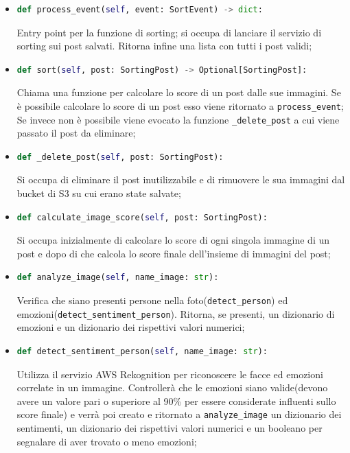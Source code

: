 \begin{itemize}
	\item 
	\begin{lstlisting}[language=Python, numbers=none]
def process_event(self, event: SortEvent) -> dict:
	\end{lstlisting}
Entry point per la funzione di sorting; si occupa di lanciare il servizio di sorting sui post salvati. Ritorna infine una lista con tutti i post validi;
	\item 
	\begin{lstlisting}[language=Python, numbers=none]
def sort(self, post: SortingPost) -> Optional[SortingPost]:
	\end{lstlisting}
Chiama una funzione per calcolare lo score di un post dalle sue immagini. Se è possibile calcolare lo score di un post esso viene ritornato a \verb+process_event+; Se invece non è possibile viene evocato la funzione \verb+_delete_post+ a cui viene passato il post da eliminare;
	\item 
	\begin{lstlisting}[language=Python, numbers=none]
def _delete_post(self, post: SortingPost):
	\end{lstlisting}		
Si occupa di eliminare il post inutilizzabile e di rimuovere le sua immagini dal bucket di S3 su cui erano state salvate;
	\item 
	\begin{lstlisting}[language=Python, numbers=none]
def calculate_image_score(self, post: SortingPost):
	\end{lstlisting}	
Si occupa inizialmente di calcolare lo score di ogni singola immagine di un post e dopo di che calcola lo score finale dell'insieme di immagini del post;
	\item
	\begin{lstlisting}[language=Python, numbers=none]
def analyze_image(self, name_image: str):
	\end{lstlisting}	
Verifica che siano presenti persone nella foto(\verb+detect_person+) ed emozioni(\verb+detect_sentiment_person+). Ritorna, se presenti, un dizionario di emozioni e un dizionario dei rispettivi valori numerici;
	\item 
	\begin{lstlisting}[language=Python, numbers=none]
def detect_sentiment_person(self, name_image: str):
	\end{lstlisting}	
Utilizza il servizio AWS Rekognition per riconoscere le facce ed emozioni correlate in un immagine. Controllerà che le emozioni siano valide(devono avere un valore pari o superiore al 90\% per essere considerate influenti sullo score finale) e verrà poi creato e ritornato a \verb+analyze_image+ un dizionario dei sentimenti, un dizionario dei rispettivi valori numerici e un booleano per segnalare di aver trovato o meno emozioni;

\end{itemize}
